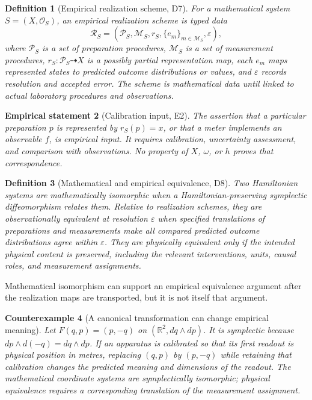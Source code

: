 \documentclass[11pt]{article}
\newtheorem{definition}{Definition}[section]
\newtheorem{empirical}[definition]{Empirical statement}
\newtheorem{counterexample}[definition]{Counterexample}
\newcommand{\R}{\mathbb{R}}
\newcommand{\Obs}{\mathcal{O}}
\begin{document}
\begin{definition}[Empirical realization scheme, D7]
For a mathematical system $S=(X,\Obs_S)$, an \emph{empirical realization scheme} is typed data
\[
 \mathcal{R}_S=(\mathcal{P}_S,\mathcal{M}_S,r_S,\{e_m\}_{m\in\mathcal{M}_S},\varepsilon),
\]
where $\mathcal{P}_S$ is a set of preparation procedures, $\mathcal{M}_S$ is a set of measurement procedures, $r_S:\mathcal{P}_S\dashrightarrow X$ is a possibly partial representation map, each $e_m$ maps represented states to predicted outcome distributions or values, and $\varepsilon$ records resolution and accepted error. The scheme is mathematical data until linked to actual laboratory procedures and observations.
\end{definition}

\begin{empirical}[Calibration input, E2]
The assertion that a particular preparation $p$ is represented by $r_S(p)=x$, or that a meter implements an observable $f$, is empirical input. It requires calibration, uncertainty assessment, and comparison with observations. No property of $X$, $\omega$, or $h$ proves that correspondence.
\end{empirical}

\begin{definition}[Mathematical and empirical equivalence, D8]
Two Hamiltonian systems are \emph{mathematically isomorphic} when a Hamiltonian-preserving symplectic diffeomorphism relates them. Relative to realization schemes, they are \emph{observationally equivalent at resolution $\varepsilon$} when specified translations of preparations and measurements make all compared predicted outcome distributions agree within $\varepsilon$. They are \emph{physically equivalent} only if the intended physical content is preserved, including the relevant interventions, units, causal roles, and measurement assignments.
\end{definition}

Mathematical isomorphism can support an empirical equivalence argument after the realization maps are transported, but it is not itself that argument.

\begin{counterexample}[A canonical transformation can change empirical meaning]
Let $F(q,p)=(p,-q)$ on $(\R^2,dq\wedge dp)$. It is symplectic because $d p\wedge d(-q)=dq\wedge dp$. If an apparatus is calibrated so that its first readout is physical position in metres, replacing $(q,p)$ by $(p,-q)$ while retaining that calibration changes the predicted meaning and dimensions of the readout. The mathematical coordinate systems are symplectically isomorphic; physical equivalence requires a corresponding translation of the measurement assignment.
\end{counterexample}
\end{document}
